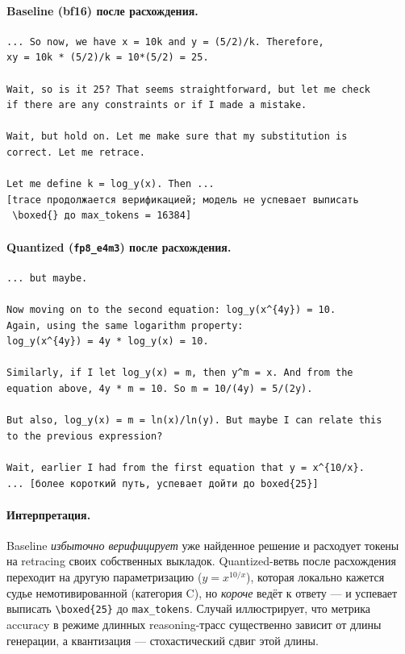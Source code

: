 \documentclass[11pt, a4paper]{article}
\newcommand{\code}[1]{\texttt{#1}}
\begin{document}
\paragraph{Baseline (bf16) после расхождения.}
\begin{lstlisting}
... So now, we have x = 10k and y = (5/2)/k. Therefore,
xy = 10k * (5/2)/k = 10*(5/2) = 25.

Wait, so is it 25? That seems straightforward, but let me check
if there are any constraints or if I made a mistake.

Wait, but hold on. Let me make sure that my substitution is
correct. Let me retrace.

Let me define k = log_y(x). Then ...
[trace продолжается верификацией; модель не успевает выписать
 \boxed{} до max_tokens = 16384]
\end{lstlisting}

\paragraph{Quantized (\code{fp8\_e4m3}) после расхождения.}
\begin{lstlisting}
... but maybe.

Now moving on to the second equation: log_y(x^{4y}) = 10.
Again, using the same logarithm property:
log_y(x^{4y}) = 4y * log_y(x) = 10.

Similarly, if I let log_y(x) = m, then y^m = x. And from the
equation above, 4y * m = 10. So m = 10/(4y) = 5/(2y).

But also, log_y(x) = m = ln(x)/ln(y). But maybe I can relate this
to the previous expression?

Wait, earlier I had from the first equation that y = x^{10/x}.
... [более короткий путь, успевает дойти до boxed{25}]
\end{lstlisting}

\paragraph{Интерпретация.} Baseline \emph{избыточно верифицирует} уже
найденное решение и расходует токены на retracing своих собственных
выкладок. Quantized-ветвь после расхождения переходит на другую
параметризацию ($y = x^{10/x}$), которая локально кажется судье
немотивированной (категория C), но \emph{короче} ведёт к ответу — и
успевает выписать \code{\textbackslash{}boxed\{25\}} до \code{max\_tokens}.
Случай иллюстрирует, что метрика accuracy в режиме длинных reasoning-трасс
существенно зависит от длины генерации, а квантизация — стохастический
сдвиг этой длины.
\end{document}
